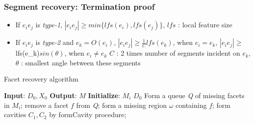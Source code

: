 \documentclass{beamer}
\begin{document}
\begin{frame}
\frametitle{Segment recovery: Termination proof}
\begin{itemize}
    \item If $e_{i}e_{j}$ is \textit{type-1}, \newline
    $|e_{i}e_{j}| \geq min\{lfs(e_i), lfs(e_j)\}$, \newline
    $lfs$ : local feature size
    \item If $e_{i}e_{j}$ is \textit{type-2} and $e_{k} = O(e_i)$, \newline
    $|e_{i}e_{j}| \geq \frac{1}{C}lfs(e_k)$, when $e_{i} = e_{k}$, \newline
    $|e_{i}e_{j}| \geq $lfs(e_k)$sin(\theta)$, when $e_{i} \ne e_{k}$ \newline
    $C$ : 2 times number of segments incident on $e_k$, \newline
    $\theta$ : smallest angle between these segments
\end{itemize}
\end{frame}

\begin{frame}{Facet recovery algorithm}
\begin{algorithm}[H]
\caption{Facet recovery}
\begin{algorithmic}[1]
\small  {
	\State \textbf{Input}: $D_0, X_0$
	\State \textbf{Output}: $M$
	\State \textbf{Initialize}: $M_i$ \gets $D_0$
	\Repeat
	\State Form a queue \textit{Q} of missing facets in $M_i$;
	\State remove a facet $f$ from \textit{Q};
	\State form a missing region $\omega$ containing $f$;
	\State form cavities $C_1, C_2$ by formCavity procedure;
	    \State {}
	\EndFor
	\EndWhile
\EndProcedure
}
\end{algorithmic}
\end{algorithm}
\end{frame}

\end{document}
